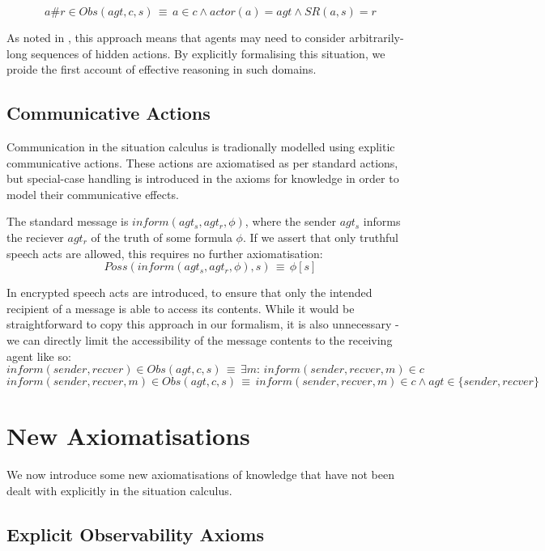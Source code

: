 \[
a\#r\in Obs(agt,c,s)\,\equiv\, a\in c\wedge actor(a)=agt\wedge SR(a,s)=r\]


As noted in \citep{Lesperance99sitcalc_approach}, this approach means
that agents may need to consider arbitrarily-long sequences of hidden
actions. By explicitly formalising this situation, we proide the first
account of effective reasoning in such domains.


\subsection{Communicative Actions}

Communication in the situation calculus is tradionally modelled using
explitic communicative actions. These actions are axiomatised as per
standard actions, but special-case handling is introduced in the axioms
for knowledge in order to model their communicative effects.

The standard message is $inform(agt_{s},agt_{r},\phi)$, where the
sender $agt_{s}$ informs the reciever $agt_{r}$ of the truth of
some formula $\phi$. If we assert that only truthful speech acts
are allowed, this requires no further axiomatisation:\[
Poss(inform(agt_{s},agt_{r},\phi),s)\,\equiv\,\phi[s]\]


In \citep{shapiro01casl_feat_inter} encrypted speech acts are introduced,
to ensure that only the intended recipient of a message is able to
access its contents. While it would be straightforward to copy this
approach in our formalism, it is also unnecessary - we can directly
limit the accessibility of the message contents to the receiving agent
like so:\[
inform(sender,recver)\in Obs(agt,c,s)\,\equiv\,\exists m:\, inform(sender,recver,m)\in c\]
 \[
inform(sender,recver,m)\in Obs(agt,c,s)\,\equiv\, inform(sender,recver,m)\in c\wedge agt\in\{sender,recver\}\]



\section{New Axiomatisations\label{sec:Observations:Axiomatising-extended}}

We now introduce some new axiomatisations of knowledge that have not
been dealt with explicitly in the situation calculus.


\subsection{Explicit Observability Axioms}

